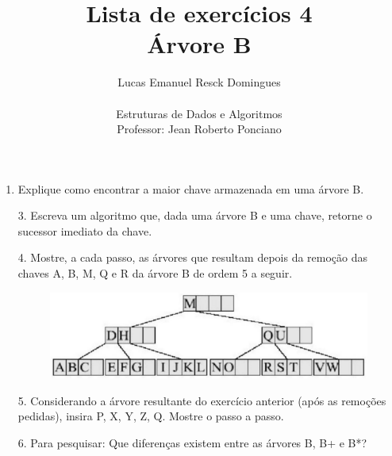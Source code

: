 \documentclass{article}
\title{Lista de exercícios 4 \\
\large Árvore B}
\author{Lucas Emanuel Resck Domingues \\ \\
Estruturas de Dados e Algoritmos \\
Professor: Jean Roberto Ponciano}
\begin{document}
    \maketitle

    \begin{enumerate}
        \item Explique como encontrar a maior chave armazenada em uma árvore B.
        
        \bigskip
        
        

        \bigskip

        \item[3.] Escreva um algoritmo que, dada uma árvore B e uma chave, retorne o sucessor imediato da chave.
        
        \bigskip
        
        

        \bigskip

        \item[4.] Mostre, a cada passo, as árvores que resultam depois da remoção das chaves A, B,
        M, Q e R da árvore B de ordem 5 a seguir.

        \begin{figure}[H]
            \centering
            \includegraphics[width=0.6\linewidth]{tree.png}
        \end{figure}
        
        \bigskip
        
        

        \bigskip

        \item[5.] Considerando a árvore resultante do exercício anterior (após as remoções pedidas),
        insira P, X, Y, Z, Q. Mostre o passo a passo.
        
        \bigskip
        
        

        \bigskip

        \item[6.] Para pesquisar: Que diferenças existem entre as árvores B, B+ e B*?
        
        \bigskip
        
        
    \end{enumerate}
\end{document}
